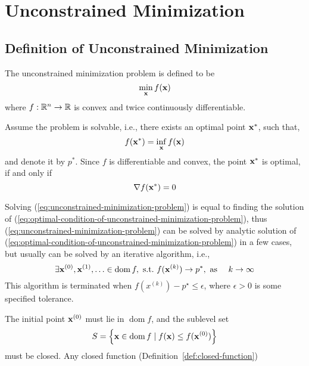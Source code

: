 \chapter{Unconstrained Minimization}

\section{Definition of Unconstrained Minimization}

\begin{definition}
	The unconstrained minimization problem is defined to be
	\begin{equation}
		\min_{{\bf x}}f({\bf x})
		\label{eq:unconstrained-minimization-problem}
	\end{equation}
	where $f:{\mathbb R}^n\rightarrow{\mathbb R}$ is convex and twice continuously differentiable.
\end{definition}

Assume the problem is solvable, i.e., there exists an optimal point ${\bf x}^{*}$, such that,
\begin{equation*}
	f({\bf x}^{*})=\inf_{{\bf x}}f({\bf x})
\end{equation*}
and denote it by $p^{*}$. Since $f$ is differentiable and convex, the point ${\bf x}^{*}$ is optimal, if and only if
\begin{equation}
	\nabla f({\bf x}^{*})=0
	\label{eq:optimal-condition-of-unconstrained-minimization-problem}
\end{equation}

Solving (\ref{eq:unconstrained-minimization-problem}) is equal to finding the solution of (\ref{eq:optimal-condition-of-unconstrained-minimization-problem}), thus (\ref{eq:unconstrained-minimization-problem}) can be solved by analytic solution of (\ref{eq:optimal-condition-of-unconstrained-minimization-problem}) in a few cases, but usually can be solved by an iterative algorithm, i.e.,
\begin{equation*}
	\exists\bfx^{(0)},\bfx^{(1)},\ldots\in\operatorname{dom}f,\ \text{s.t.}\ f(\bfx^{(k)})\rightarrow p^{*},\ \text{as}\ \quad k\rightarrow\infty
\end{equation*}
This algorithm is terminated when $f\left(x^{(k)}\right)-p^{\star}\leq\epsilon$, where $\epsilon>0$ is some specified tolerance.

\begin{remark}
	The initial point ${\bf x}^{(0)}$ must lie in $\operatorname{dom}f$, and the sublevel set
	\begin{equation*}
		S=\left\{{\bf x}\in\operatorname{dom}f\mid f({\bf x})\leq f({\bf x}^{(0)})\right\}
	\end{equation*}
	must be closed. Any closed function (Definition~\ref{def:closed-function})
\end{remark}


